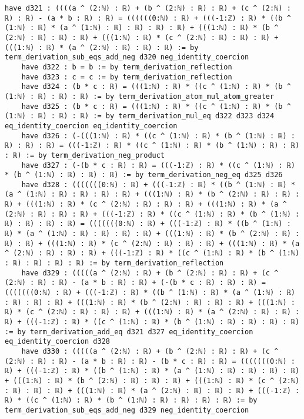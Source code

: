 \documentclass{article}
\begin{document}
\begin{tcolorbox}[colback=white!10, width=\linewidth]
\begin{lstlisting}[language=Lean4]
    have d321 : ((((a ^ (2:ℕ) : ℝ) + (b ^ (2:ℕ) : ℝ) : ℝ) + (c ^ (2:ℕ) : ℝ) : ℝ) - (a * b : ℝ) : ℝ) = ((((((0:ℕ) : ℝ) + (((-1:ℤ) : ℝ) * ((b ^ (1:ℕ) : ℝ) * (a ^ (1:ℕ) : ℝ) : ℝ) : ℝ) : ℝ) + (((1:ℕ) : ℝ) * (b ^ (2:ℕ) : ℝ) : ℝ) : ℝ) + (((1:ℕ) : ℝ) * (c ^ (2:ℕ) : ℝ) : ℝ) : ℝ) + (((1:ℕ) : ℝ) * (a ^ (2:ℕ) : ℝ) : ℝ) : ℝ) := by term_derivation_sub_eqs_add_neg d320 neg_identity_coercion
    have d322 : b = b := by term_derivation_reflection
    have d323 : c = c := by term_derivation_reflection
    have d324 : (b * c : ℝ) = (((1:ℕ) : ℝ) * ((c ^ (1:ℕ) : ℝ) * (b ^ (1:ℕ) : ℝ) : ℝ) : ℝ) := by term_derivation_atom_mul_atom_greater
    have d325 : (b * c : ℝ) = (((1:ℕ) : ℝ) * ((c ^ (1:ℕ) : ℝ) * (b ^ (1:ℕ) : ℝ) : ℝ) : ℝ) := by term_derivation_mul_eq d322 d323 d324 eq_identity_coercion eq_identity_coercion
    have d326 : (-(((1:ℕ) : ℝ) * ((c ^ (1:ℕ) : ℝ) * (b ^ (1:ℕ) : ℝ) : ℝ) : ℝ) : ℝ) = (((-1:ℤ) : ℝ) * ((c ^ (1:ℕ) : ℝ) * (b ^ (1:ℕ) : ℝ) : ℝ) : ℝ) := by term_derivation_neg_product
    have d327 : (-(b * c : ℝ) : ℝ) = (((-1:ℤ) : ℝ) * ((c ^ (1:ℕ) : ℝ) * (b ^ (1:ℕ) : ℝ) : ℝ) : ℝ) := by term_derivation_neg_eq d325 d326
    have d328 : (((((((0:ℕ) : ℝ) + (((-1:ℤ) : ℝ) * ((b ^ (1:ℕ) : ℝ) * (a ^ (1:ℕ) : ℝ) : ℝ) : ℝ) : ℝ) + (((1:ℕ) : ℝ) * (b ^ (2:ℕ) : ℝ) : ℝ) : ℝ) + (((1:ℕ) : ℝ) * (c ^ (2:ℕ) : ℝ) : ℝ) : ℝ) + (((1:ℕ) : ℝ) * (a ^ (2:ℕ) : ℝ) : ℝ) : ℝ) + (((-1:ℤ) : ℝ) * ((c ^ (1:ℕ) : ℝ) * (b ^ (1:ℕ) : ℝ) : ℝ) : ℝ) : ℝ) = (((((((0:ℕ) : ℝ) + (((-1:ℤ) : ℝ) * ((b ^ (1:ℕ) : ℝ) * (a ^ (1:ℕ) : ℝ) : ℝ) : ℝ) : ℝ) + (((1:ℕ) : ℝ) * (b ^ (2:ℕ) : ℝ) : ℝ) : ℝ) + (((1:ℕ) : ℝ) * (c ^ (2:ℕ) : ℝ) : ℝ) : ℝ) + (((1:ℕ) : ℝ) * (a ^ (2:ℕ) : ℝ) : ℝ) : ℝ) + (((-1:ℤ) : ℝ) * ((c ^ (1:ℕ) : ℝ) * (b ^ (1:ℕ) : ℝ) : ℝ) : ℝ) : ℝ) := by term_derivation_reflection
    have d329 : (((((a ^ (2:ℕ) : ℝ) + (b ^ (2:ℕ) : ℝ) : ℝ) + (c ^ (2:ℕ) : ℝ) : ℝ) - (a * b : ℝ) : ℝ) + (-(b * c : ℝ) : ℝ) : ℝ) = (((((((0:ℕ) : ℝ) + (((-1:ℤ) : ℝ) * ((b ^ (1:ℕ) : ℝ) * (a ^ (1:ℕ) : ℝ) : ℝ) : ℝ) : ℝ) + (((1:ℕ) : ℝ) * (b ^ (2:ℕ) : ℝ) : ℝ) : ℝ) + (((1:ℕ) : ℝ) * (c ^ (2:ℕ) : ℝ) : ℝ) : ℝ) + (((1:ℕ) : ℝ) * (a ^ (2:ℕ) : ℝ) : ℝ) : ℝ) + (((-1:ℤ) : ℝ) * ((c ^ (1:ℕ) : ℝ) * (b ^ (1:ℕ) : ℝ) : ℝ) : ℝ) : ℝ) := by term_derivation_add_eq d321 d327 eq_identity_coercion eq_identity_coercion d328
    have d330 : (((((a ^ (2:ℕ) : ℝ) + (b ^ (2:ℕ) : ℝ) : ℝ) + (c ^ (2:ℕ) : ℝ) : ℝ) - (a * b : ℝ) : ℝ) - (b * c : ℝ) : ℝ) = (((((((0:ℕ) : ℝ) + (((-1:ℤ) : ℝ) * ((b ^ (1:ℕ) : ℝ) * (a ^ (1:ℕ) : ℝ) : ℝ) : ℝ) : ℝ) + (((1:ℕ) : ℝ) * (b ^ (2:ℕ) : ℝ) : ℝ) : ℝ) + (((1:ℕ) : ℝ) * (c ^ (2:ℕ) : ℝ) : ℝ) : ℝ) + (((1:ℕ) : ℝ) * (a ^ (2:ℕ) : ℝ) : ℝ) : ℝ) + (((-1:ℤ) : ℝ) * ((c ^ (1:ℕ) : ℝ) * (b ^ (1:ℕ) : ℝ) : ℝ) : ℝ) : ℝ) := by term_derivation_sub_eqs_add_neg d329 neg_identity_coercion

\end{lstlisting}
\end{tcolorbox}
\end{document}
